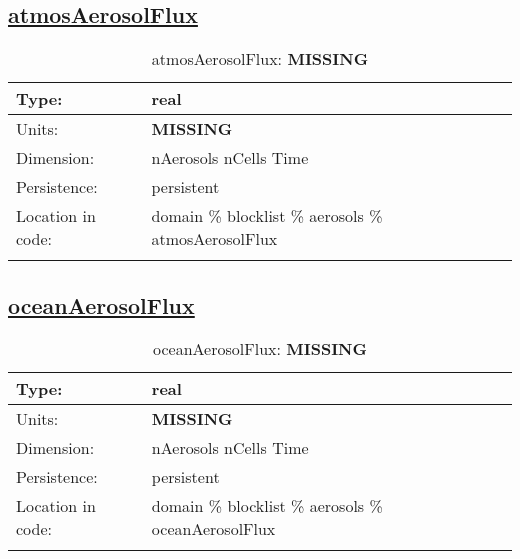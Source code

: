 \subsection[atmosAerosolFlux]{\hyperref[sec:var_tab_aerosols]{atmosAerosolFlux}}
\label{subsec:var_sec_aerosols_atmosAerosolFlux}
\begin{center}
\begin{longtable}{| p{2.0in} | p{4.0in} |}
        \hline 
        Type: & real \\
        \hline 
        Units: & {\bf \color{red} MISSING} \\
        \hline 
        Dimension: & nAerosols nCells Time \\
        \hline 
        Persistence: & persistent \\
        \hline 
         Location in code: & domain \% blocklist \% aerosols \% atmosAerosolFlux \\
         \hline 
    \caption{atmosAerosolFlux: {\bf \color{red} MISSING}}
\end{longtable}
\end{center}
\subsection[oceanAerosolFlux]{\hyperref[sec:var_tab_aerosols]{oceanAerosolFlux}}
\label{subsec:var_sec_aerosols_oceanAerosolFlux}
\begin{center}
\begin{longtable}{| p{2.0in} | p{4.0in} |}
        \hline 
        Type: & real \\
        \hline 
        Units: & {\bf \color{red} MISSING} \\
        \hline 
        Dimension: & nAerosols nCells Time \\
        \hline 
        Persistence: & persistent \\
        \hline 
         Location in code: & domain \% blocklist \% aerosols \% oceanAerosolFlux \\
         \hline 
    \caption{oceanAerosolFlux: {\bf \color{red} MISSING}}
\end{longtable}
\end{center}
